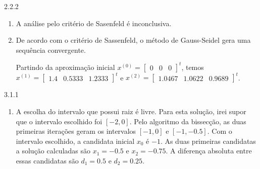 \begin{Solucao}{2.2.2}
\begin{enumerate}
\item A análise pelo critério de Sasenfeld é inconclusiva.
\item De acordo com o critério de Sassenfeld, o método de Gauss-Seidel gera uma sequência convergente.

Partindo da aproximação inicial $x^{(0)}=\begin{bmatrix}
0&0&0
\end{bmatrix}^t$, temos $x^{(1)}=\begin{bmatrix}
1.4& 0.5333 &1.2333
\end{bmatrix}^t$ e $x^{(2)}=\begin{bmatrix}
1.0467& 1.0622 &0.9689
\end{bmatrix}^t$.
\end{enumerate}
\end{Solucao}
\begin{Solucao}{3.1.1}
\begin{enumerate}
\item A escolha do intervalo que possui raiz é livre. Para esta solução, irei supor que o intervalo escolhido foi $[-2,0]$. Pelo algoritmo da bissecção, as duas primeiras iterações geram os intervalos $[-1,0]$ e $[-1,-0.5]$. Com o intervalo escolhido, a candidata inicial $x_0$ é $-1$. As duas primeiras candidatas a solução calculadas são $x_1=-0.5$ e $x_2=-0.75$. A diferença absoluta entre essas candidatas são $d_1=0.5$ e $d_2=0.25$.
\end{enumerate}
\end{Solucao}
